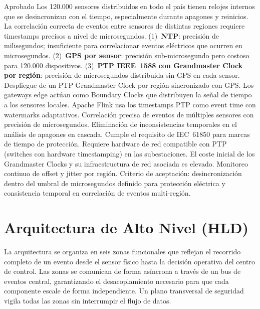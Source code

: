 \documentclass[12pt, letterpaper]{article}
\begin{document}
  {Aprobado}
  {Los 120.000 sensores distribuidos en todo el país tienen relojes internos que se
   desincronizan con el tiempo, especialmente durante apagones y reinicios. La
   correlación correcta de eventos entre sensores de distintas regiones requiere
   timestamps precisos a nivel de microsegundos.}
  {(1)~\textbf{NTP}: precisión de milisegundos; insuficiente para correlacionar eventos
   eléctricos que ocurren en microsegundos.
   (2)~\textbf{GPS por sensor}: precisión sub-microsegundo pero costoso para 120.000
   dispositivos.
   (3)~\textbf{PTP IEEE~1588 con Grandmaster Clock por región}: precisión de
   microsegundos distribuida sin GPS en cada sensor.}
  {Despliegue de un PTP Grandmaster Clock por región sincronizado con GPS. Los
   gateways edge actúan como Boundary Clocks que distribuyen la señal de tiempo a los
   sensores locales. Apache Flink usa los timestamps PTP como event time con watermarks
   adaptativos.}
  {Correlación precisa de eventos de múltiples sensores con precisión de microsegundos.
   Eliminación de inconsistencias temporales en el análisis de apagones en cascada.
   Cumple el requisito de IEC~61850 para marcas de tiempo de protección.}
  {Requiere hardware de red compatible con PTP (switches con hardware timestamping) en
    las subestaciones. El coste inicial de los Grandmaster Clocks y su infraestructura
    de red asociada es elevado.}
    {Monitoreo continuo de offset y jitter por región. Criterio de aceptación:
    desincronización dentro del umbral de microsegundos definido para protección
    eléctrica y consistencia temporal en correlación de eventos multi-región.}

\section{Arquitectura de Alto Nivel (HLD)}

La arquitectura se organiza en seis zonas funcionales que reflejan el recorrido completo
de un evento desde el sensor físico hasta la decisión operativa del centro de control.
Las zonas se comunican de forma asíncrona a través de un bus de eventos central,
garantizando el desacoplamiento necesario para que cada componente escale de forma
independiente. Un plano transversal de seguridad vigila todas las zonas sin interrumpir
el flujo de datos.
\end{document}
